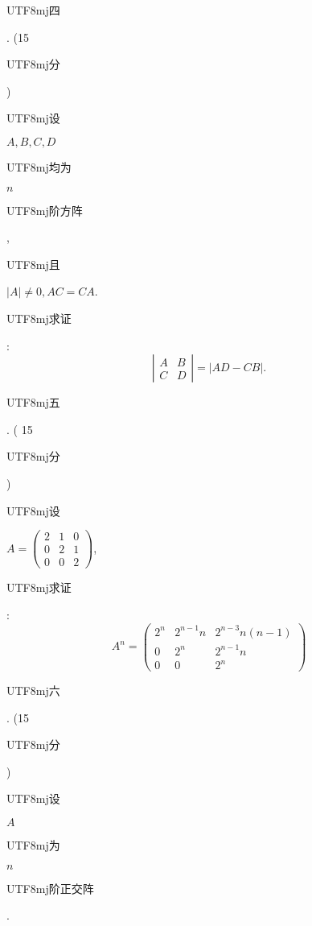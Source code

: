 \documentclass[10pt]{article}
\begin{document}
\begin{CJK}{UTF8}{mj}四\end{CJK}. (15 \begin{CJK}{UTF8}{mj}分\end{CJK}) \begin{CJK}{UTF8}{mj}设\end{CJK} $A, B, C, D$ \begin{CJK}{UTF8}{mj}均为\end{CJK} $n$ \begin{CJK}{UTF8}{mj}阶方阵\end{CJK}, \begin{CJK}{UTF8}{mj}且\end{CJK} $|A| \neq 0, A C=C A$. \begin{CJK}{UTF8}{mj}求证\end{CJK}:
$$
\left|\begin{array}{ll}
A & B \\
C & D
\end{array}\right|=|A D-C B| .
$$
\begin{CJK}{UTF8}{mj}五\end{CJK}. ( 15 \begin{CJK}{UTF8}{mj}分\end{CJK}) \begin{CJK}{UTF8}{mj}设\end{CJK} $A=\left(\begin{array}{lll}2 & 1 & 0 \\ 0 & 2 & 1 \\ 0 & 0 & 2\end{array}\right)$, \begin{CJK}{UTF8}{mj}求证\end{CJK}:
$$
A^{n}=\left(\begin{array}{ccc}
2^{n} & 2^{n-1} n & 2^{n-3} n(n-1) \\
0 & 2^{n} & 2^{n-1} n \\
0 & 0 & 2^{n}
\end{array}\right)
$$
\begin{CJK}{UTF8}{mj}六\end{CJK}. (15 \begin{CJK}{UTF8}{mj}分\end{CJK}) \begin{CJK}{UTF8}{mj}设\end{CJK} $A$ \begin{CJK}{UTF8}{mj}为\end{CJK} $n$ \begin{CJK}{UTF8}{mj}阶正交阵\end{CJK}.
\end{document}
